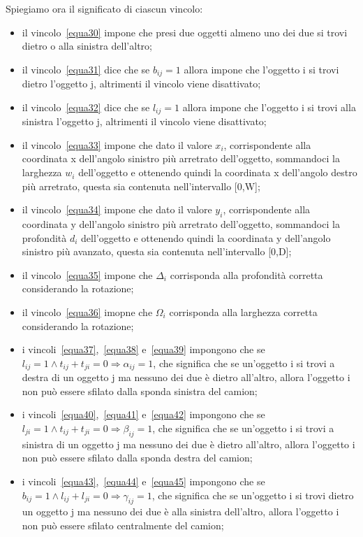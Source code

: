 \newpage
Spiegiamo ora il significato di ciascun vincolo:
\begin{itemize}
	\item il vincolo~\eqref{equa30} impone che presi due oggetti almeno uno dei due si trovi dietro o alla sinistra dell'altro;
	\item il vincolo~\eqref{equa31} dice che se $b_{ij} = 1$ allora impone che l'oggetto i si trovi dietro l'oggetto j, altrimenti il vincolo viene disattivato;
	\item il vincolo~\eqref{equa32} dice che se $l_{ij} = 1$ allora impone che l'oggetto i si trovi alla sinistra l'oggetto j, altrimenti il vincolo viene disattivato;
	\item il vincolo~\eqref{equa33} impone che dato il valore $x_i$, corrispondente alla coordinata x dell'angolo sinistro più arretrato dell'oggetto, sommandoci la larghezza $w_i$ dell'oggetto e ottenendo quindi la coordinata x dell'angolo destro più arretrato, questa sia contenuta nell'intervallo [0,W];
	\item il vincolo~\eqref{equa34} impone che dato il valore $y_i$, corrispondente alla coordinata y dell'angolo sinistro più arretrato dell'oggetto, sommandoci la profondità $d_i$ dell'oggetto e ottenendo quindi la coordinata y dell'angolo sinistro più avanzato, questa sia contenuta nell'intervallo [0,D];
	\item il vincolo~\eqref{equa35} impone che $\Delta_i$ corrisponda alla profondità corretta considerando la rotazione;
	\item il vincolo~\eqref{equa36} imopne che $\Omega_i$ corrisponda alla larghezza corretta considerando la rotazione;
	\item i vincoli~\eqref{equa37},~\eqref{equa38} e~\eqref{equa39} impongono che se $l_{ij} = 1 \land t_{ij} + t_{ji} = 0 \Rightarrow \alpha_{ij} = 1$, che significa che se un'oggetto i si trovi a destra di un oggetto j ma nessuno dei due è dietro all'altro, allora l'oggetto i non può essere sfilato dalla sponda sinistra del camion;
	\item i vincoli~\eqref{equa40},~\eqref{equa41} e~\eqref{equa42} impongono che se $l_{ji} = 1 \land t_{ij} + t_{ji} = 0 \Rightarrow \beta_{ij} = 1$, che significa che se un'oggetto i si trovi a sinistra di un oggetto j ma nessuno dei due è dietro all'altro, allora l'oggetto i non può essere sfilato dalla sponda destra del camion;
	\item i vincoli~\eqref{equa43},~\eqref{equa44} e~\eqref{equa45} impongono che se $b_{ij} = 1 \land l_{ij} + l_{ji} = 0 \Rightarrow \gamma_{ij} = 1$, che significa che se un'oggetto i si trovi dietro un oggetto j ma nessuno dei due è alla sinistra dell'altro, allora l'oggetto i non può essere sfilato centralmente del camion;

\end{itemize}
